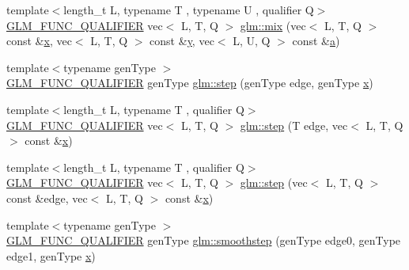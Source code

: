 \begin{DoxyCompactItemize}
\item 
{\footnotesize template$<$length\+\_\+t L, typename T , typename U , qualifier Q$>$ }\\\hyperlink{setup_8hpp_a33fdea6f91c5f834105f7415e2a64407}{G\+L\+M\+\_\+\+F\+U\+N\+C\+\_\+\+Q\+U\+A\+L\+I\+F\+I\+ER} vec$<$ L, T, Q $>$ \hyperlink{group__core__func__common_ga2f4d9048be98850541fca540eaad50e9}{glm\+::mix} (vec$<$ L, T, Q $>$ const \&\hyperlink{_s_d_l__opengl_8h_ad0e63d0edcdbd3d79554076bf309fd47}{x}, vec$<$ L, T, Q $>$ const \&\hyperlink{_s_d_l__opengl_8h_a1675d9d7bb68e1657ff028643b4037e3}{y}, vec$<$ L, U, Q $>$ const \&\hyperlink{_s_d_l__opengl__glext_8h_a3309789fc188587d666cda5ece79cf82}{a})
\item 
{\footnotesize template$<$typename gen\+Type $>$ }\\\hyperlink{setup_8hpp_a33fdea6f91c5f834105f7415e2a64407}{G\+L\+M\+\_\+\+F\+U\+N\+C\+\_\+\+Q\+U\+A\+L\+I\+F\+I\+ER} gen\+Type \hyperlink{group__core__func__common_ga015a1261ff23e12650211aa872863cce}{glm\+::step} (gen\+Type edge, gen\+Type \hyperlink{_s_d_l__opengl_8h_ad0e63d0edcdbd3d79554076bf309fd47}{x})
\item 
{\footnotesize template$<$length\+\_\+t L, typename T , qualifier Q$>$ }\\\hyperlink{setup_8hpp_a33fdea6f91c5f834105f7415e2a64407}{G\+L\+M\+\_\+\+F\+U\+N\+C\+\_\+\+Q\+U\+A\+L\+I\+F\+I\+ER} vec$<$ L, T, Q $>$ \hyperlink{group__core__func__common_ga8f9a911a48ef244b51654eaefc81c551}{glm\+::step} (T edge, vec$<$ L, T, Q $>$ const \&\hyperlink{_s_d_l__opengl_8h_ad0e63d0edcdbd3d79554076bf309fd47}{x})
\item 
{\footnotesize template$<$length\+\_\+t L, typename T , qualifier Q$>$ }\\\hyperlink{setup_8hpp_a33fdea6f91c5f834105f7415e2a64407}{G\+L\+M\+\_\+\+F\+U\+N\+C\+\_\+\+Q\+U\+A\+L\+I\+F\+I\+ER} vec$<$ L, T, Q $>$ \hyperlink{group__core__func__common_gaf4a5fc81619c7d3e8b22f53d4a098c7f}{glm\+::step} (vec$<$ L, T, Q $>$ const \&edge, vec$<$ L, T, Q $>$ const \&\hyperlink{_s_d_l__opengl_8h_ad0e63d0edcdbd3d79554076bf309fd47}{x})
\item 
{\footnotesize template$<$typename gen\+Type $>$ }\\\hyperlink{setup_8hpp_a33fdea6f91c5f834105f7415e2a64407}{G\+L\+M\+\_\+\+F\+U\+N\+C\+\_\+\+Q\+U\+A\+L\+I\+F\+I\+ER} gen\+Type \hyperlink{group__core__func__common_ga562edf7eca082cc5b7a0aaf180436daf}{glm\+::smoothstep} (gen\+Type edge0, gen\+Type edge1, gen\+Type \hyperlink{_s_d_l__opengl_8h_ad0e63d0edcdbd3d79554076bf309fd47}{x})
\item 

\end{DoxyCompactItemize}
